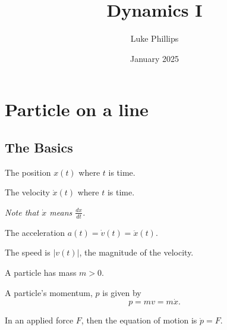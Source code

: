 \documentclass[10pt, a4paper]{article}
\title{Dynamics I}
\author{Luke Phillips}
\date{January 2025}
\begin{document}
\maketitle

\newpage

\tableofcontents

\newpage

\section{Particle on a line}

\subsection{The Basics}

\begin{definition}[Position]
    The position $x(t)$ where $t$ is time.
\end{definition}

\begin{definition}[Velocity]
    The velocity $\dot{x}(t)$ where $t$ is time.
\end{definition}

\textit{Note that $\dot{x}$ means $\frac{dx}{dt}$.}

\begin{definition}[Acceleration]
    The acceleration $a(t) = \dot{v}(t) = \ddot{x}(t)$.
\end{definition}

\begin{definition}[Speed]
    The speed is $|v(t)|$,
    the magnitude of the velocity.
\end{definition}

\begin{definition}[Mass]
    A particle has mass $m > 0$.
\end{definition}

\begin{definition}[Momentum]
    A particle's momentum,
    $p$ is given by
    \[
    p = mv = m\dot{x}.
    \]
\end{definition}

\begin{definition}
    In an applied force $F$,
    then the equation of motion is $\dot{p} = F$.
\end{definition}
\end{document}
